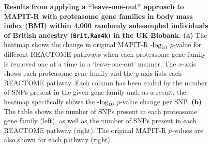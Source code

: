\documentclass[10pt]{article}
\def\log{{\rm log}}
\begin{document}
\begin{figure}[H]
\caption{\textbf{Results from applying a ``leave-one-out'' approach to MAPIT-R with proteasome gene families in body mass index (BMI) within 4,000 randomly subsampled individuals of British ancestry (\texttt{Brit.Ran4k}) in the UK Biobank.} \textbf{(a)} The heatmap shows the change in original MAPIT-R -$\log_{10}$ $p$-value for different REACTOME pathways when each proteasome gene family is removed one at a time in a `leave-one-out' manner. The $x$-axis shows each proteasome gene family and the $y$-axis lists each REACTOME pathway. Each column has been scaled by the number of SNPs present in the given gene family and, as a result, the heatmap specifically shows the -$\log_{10}$ $p$-value change per SNP. \textbf{(b)} The table shows the number of SNPs present in each proteasome gene family (left), as well as the number of SNPs present in each REACTOME pathway (right). The original MAPIT-R $p$-values are also shown for each pathway (right).}
\label{InterPath-Supp-Figure-Prot-Heatplots-BritRan4000}
\end{figure}
\clearpage

\end{document}
